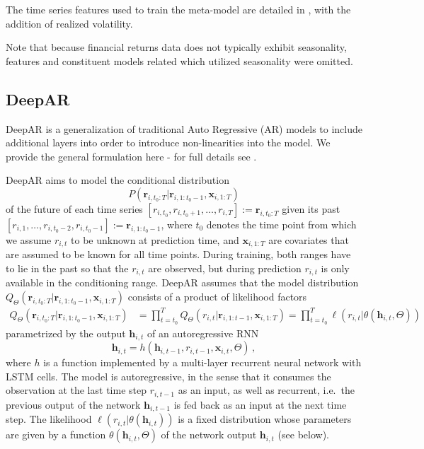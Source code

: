 \documentclass{article}
\newcommand{\rs}[2]{r_{#1, #2}}
\newcommand{\xbf}{\mathbf{x}}
\newcommand{\rVec}[3]{\mathbf{r}_{#1, #2:#3}}
\newcommand{\xVec}[3]{\mathbf{x}_{#1, #2:#3}}
\newcommand{\hVec}{\mathbf{h}}
\begin{document}
The time series features used to train the meta-model are detailed in \cite{montero-manso_fforma_2020}, with the addition of realized volatility.

Note that because financial returns data does not typically exhibit seasonality, features and constituent models related which utilized seasonality were omitted.

\FloatBarrier
\subsection{DeepAR}

DeepAR is a generalization of traditional Auto Regressive (AR) models to include additional layers into order to introduce non-linearities into the model. We provide the general formulation here - for full details see \cite{salinas_deepar_2019}.


\newcommand{\modelDist}{Q_\Theta(\rVec{i}{t_0}{T} | \rVec{i}{1}{t_0-1}, \xVec{i}{1}{T})}

DeepAR aims to model the conditional distribution 
\begin{equation*}
P(\rVec{i}{t_0}{T} | \rVec{i}{1}{t_0-1}, \xVec{i}{1}{T})
\label{eq:condDist}
\end{equation*} 
of the future of each time series $[\rs{i}{t_0}, \rs{i}{t_0 + 1}, \ldots, \rs{i}{T}] := \rVec{i}{t_0}{T}$ given its \hbox{past $[\rs{i}{1}, \ldots, \rs{i}{t_0-2}, \rs{i}{t_0-1}] := \rVec{i}{1}{t_0-1}$}, where $t_0$ denotes the time point from which we assume $\rs{i}{t}$ to be unknown at prediction time, and $\xVec{i}{1}{T}$ are covariates that are assumed to be known for all time points. During training, both ranges have to lie in the past so that the $\rs{i}{t}$ are observed, but during prediction $\rs{i}{t}$ is only available in the conditioning range. DeepAR assumes that the model distribution $\modelDist$ consists of a product of likelihood factors
\begin{align*}
\modelDist &= \prod\nolimits_{t=t_0}^T Q_\Theta(r_{i,t}|\mathbf{r}_{i,1:t-1}, \xVec{i}{1}{T}) = \prod\nolimits_{t=t_0}^T \ell(\rs{i}{t} | \theta(\hVec_{i, t}, \Theta))
\end{align*}
parametrized by the output $\hVec_{i, t}$ of an autoregressive RNN
\begin{equation}
\hVec_{i, t} = h\left(\hVec_{i, t-1}, \rs{i}{t-1}, \xbf_{i, t}, \Theta\right) \,,
\label{eq:recurrence}
\end{equation}
where $h$ is a function implemented by a multi-layer recurrent neural network with LSTM cells. The model is autoregressive, in the sense that it consumes the observation at the last time step $\rs{i}{t-1}$ as an input, as well as recurrent, i.e.\ the previous output of the network $\hVec_{i,t-1}$ is fed back as an input at the next time step. The likelihood $\ell(\rs{i}{t}|\theta(\hVec_{i,t}))$ is a fixed distribution whose parameters are given by a function $\theta(\hVec_{i,t}, \Theta)$ of the network output $\hVec_{i, t}$ (see below).
\end{document}
